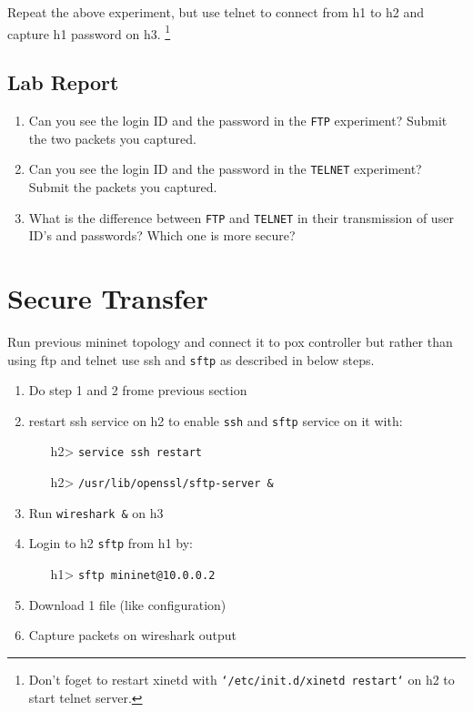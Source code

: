 \documentclass[10pt,a4paper]{article}
\numberwithin{equation}{section}
\numberwithin{figure}{section}
\numberwithin{table}{section}
\begin{document}
	Repeat the above experiment, but use telnet to connect from h1 to h2 and capture h1 password on h3. \footnote{Don't foget to restart xinetd with \texttt{`/etc/init.d/xinetd restart`} on h2 to start telnet server. }
	
	\subsection*{Lab Report}
	\begin{enumerate}
		\setlength{\itemindent}{0pt}
		\item Can you see the login ID and the password in the \texttt{FTP} experiment? Submit the two packets you captured.
		\item Can you see the login ID and the password in the \texttt{TELNET} experiment? Submit the packets you captured.
		\item What is the difference between \texttt{FTP} and \texttt{TELNET} in their transmission of user ID’s and passwords? Which one is more secure?
	\end{enumerate}
	
	\section{Secure Transfer}
	Run previous mininet topology and connect it to pox controller but rather than using ftp and telnet use ssh and \texttt{sftp} as described in below steps.
	
	\begin{enumerate}
		\setlength{\itemindent}{10pt}
		\item Do step 1 and 2 frome previous section
		\item restart ssh service on h2 to enable \texttt{ssh} and \texttt{sftp} service on it with:
		\begin{enumerate}
			\setlength{\itemindent}{10pt}
			\item [h2>] \texttt{service ssh restart}
			\item [h2>] \texttt{/usr/lib/openssl/sftp-server \&}
		\end{enumerate}
		\item Run \texttt{wireshark \&} on h3
		\item Login to h2 \texttt{sftp} from h1 by:
		\begin{enumerate}
			\setlength{\itemindent}{10pt}
			\item [h1>] \texttt{sftp mininet@10.0.0.2}
		\end{enumerate}
		\item Download 1 file (like configuration)
		\item Capture packets on wireshark output
		
	\end{enumerate}
	
\end{document}
